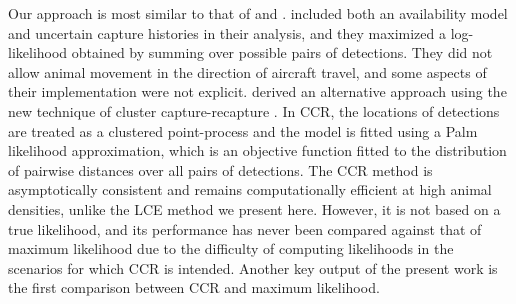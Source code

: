 \documentclass[useAMS, usenatbib, referee]{biom}\usepackage[]{graphicx}\usepackage[]{color}
\begin{document}
Our approach is most similar to that of \cite{Hiby+Lovell:98} and \cite{Stevenson+al:18}.  \cite{Hiby+Lovell:98} included both an availability model and uncertain capture histories in their analysis, and they maximized a log-likelihood obtained by summing over possible pairs of detections. They did not allow animal movement in the direction of aircraft travel, and some aspects of their implementation were not explicit. \cite{Stevenson+al:18} derived an alternative approach using the new technique of cluster capture-recapture \citep[CCR; see ][]{Fewster+al:16}. In CCR, the locations of detections are treated as a clustered point-process and the model is fitted using a Palm likelihood approximation, which is an objective function fitted to the distribution of pairwise distances over all pairs of detections. The CCR method is asymptotically consistent and remains computationally efficient at high animal densities, unlike the LCE method we present here. However, it is not based on a true likelihood, and its performance has never been compared against that of maximum likelihood due to the difficulty of computing likelihoods in the scenarios for which CCR is intended. Another key output of the present work is the first comparison between CCR and maximum likelihood.





\end{document}
